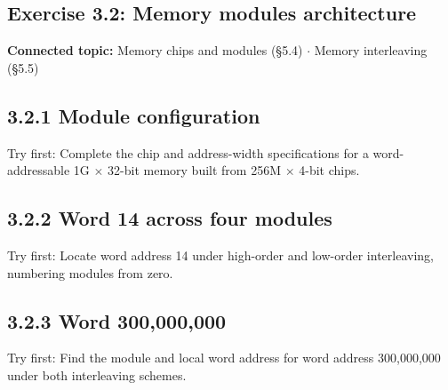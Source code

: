 \documentclass[11pt]{article}
\begin{document}
\begin{keepsection}
\section{Exercise 3.2: Memory modules architecture}

\textbf{Connected topic:} Memory chips and modules (§5.4) \ensuremath{\cdot} Memory interleaving (§5.5)

\begin{keepsection}
\subsection{3.2.1 Module configuration}

Try first: Complete the chip and address-width specifications for a word-addressable 1G \ensuremath{\times} 32-bit memory built from 256M \ensuremath{\times} 4-bit chips.

\end{keepsection}

\begin{keepsection}
\subsection{3.2.2 Word 14 across four modules}

Try first: Locate word address 14 under high-order and low-order interleaving, numbering modules from zero.

\end{keepsection}

\begin{keepsection}
\subsection{3.2.3 Word 300,000,000}

Try first: Find the module and local word address for word address 300,000,000 under both interleaving schemes.

\end{keepsection}
\end{keepsection}
\end{document}
